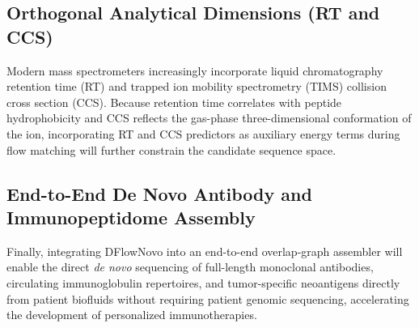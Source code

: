 \subsection{Orthogonal Analytical Dimensions (RT and CCS)}
Modern mass spectrometers increasingly incorporate liquid chromatography retention time (RT) and trapped ion mobility spectrometry (TIMS) collision cross section (CCS). Because retention time correlates with peptide hydrophobicity and CCS reflects the gas-phase three-dimensional conformation of the ion, incorporating RT and CCS predictors as auxiliary energy terms during flow matching will further constrain the candidate sequence space.

\subsection{End-to-End De Novo Antibody and Immunopeptidome Assembly}
Finally, integrating DFlowNovo into an end-to-end overlap-graph assembler will enable the direct \emph{de novo} sequencing of full-length monoclonal antibodies, circulating immunoglobulin repertoires, and tumor-specific neoantigens directly from patient biofluids without requiring patient genomic sequencing, accelerating the development of personalized immunotherapies.
